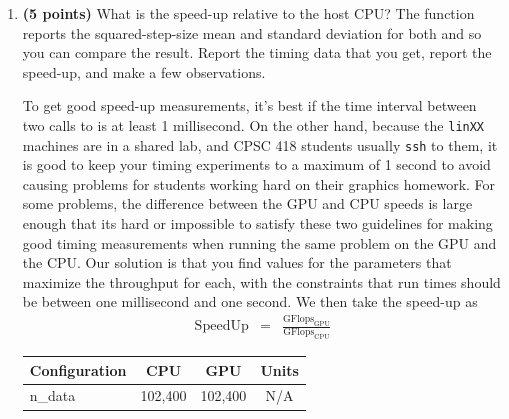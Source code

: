 \documentclass{article}
\newenvironment{answer}
{\par\color{blue}}
{\normalfont\par}
\begin{document}
\begin{enumerate}
\begin{enumerate}
              \item \textbf{(5 points)}
                    What is the speed-up relative to the host CPU?
                    The  function reports the squared-step-size mean and standard deviation
                    for both  and  so you can compare the result.
                    Report the timing data that you get, report the speed-up, and make a few observations.
                    \par
                    To get good speed-up measurements, it's best if the time interval between two calls
                    to  is at least 1 millisecond.  On the other hand, because the \texttt{linXX}
                    machines are in a shared lab, and CPSC 418 students usually \texttt{ssh} to them, it is
                    good to keep your timing experiments to a maximum of 1 second to avoid causing problems
                    for students working hard on their graphics homework.  For some problems, the difference
                    between the GPU and CPU speeds is large enough that its hard or impossible to satisfy
                    these two guidelines for making good timing measurements when running the same problem
                    on the GPU and the CPU.  Our solution is that you find values for the parameters that
                    maximize the throughput for each, with the constraints that run times should be between
                    one millisecond and one second.  We then take the speed-up as
                    \begin{displaymath}\begin{array}{rcl}
                            \mathrm{SpeedUp} & = & \displaystyle\frac{\mathrm{GFlops}_{\mathrm{GPU}}}{\mathrm{GFlops}_{\mathrm{CPU}}}
                        \end{array}\end{displaymath}
                    \begin{answer}
                        \begin{center}
                            \begin{tabular}{|l|c|c|c|}
                                \hline
                                \textbf{Configuration} & \textbf{CPU}         & \textbf{GPU}          & \textbf{Units} \\
                                \hline
                                n\_data                & 102,400              & 102,400               & N/A            \\

\end{tabular}
\end{center}
\end{answer}
\end{enumerate}
\end{enumerate}
\end{document}
